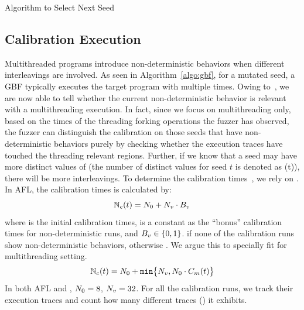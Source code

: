 \begin{algorithm}[t]
  \caption{Algorithm to Select Next Seed}\label{algo:select_seed}
\end{algorithm}


\subsection{Calibration Execution}\label{sec:calibrate}
Multithreaded programs introduce non-deterministic behaviors when different interleavings are involved.
As seen in Algorithm~\ref{algo:gbf}, for a mutated seed, a GBF typically executes the target program with multiple times. 
Owing to~\rtifunc, we are now able to tell whether the current non-deterministic behavior is relevant with a multithreading execution. In fact, since we focus on multithreading only, based on the times of the threading forking operations the fuzzer has observed, the fuzzer can distinguish the calibration on those seeds that have non-deterministic behaviors purely by checking whether the execution traces have touched the threading relevant regions. Further, if we know that a seed may have more distinct values of \tctxSign (the number of distinct values for seed $t$ is denoted as \Nmt(t)), there will be more interleavings. To determine the calibration times~\Ncal, we rely on \Nmt. In AFL, the calibration times is calculated by:
{\myeqsize\begin{equation}
    \mathbb{N}_{c}(t) = N_0 + N_v\cdot B_v \label{eq:afl_cal}
\end{equation}}
where \NcalO is the initial calibration times, \NcalV is a constant as the ``bonus'' calibration times for non-deterministic runs, and $B_v\in\{0,1\}$.  if none of the \NcalO calibration runs show non-deterministic behaviors, otherwise . We argue this to specially fit for multithreading setting. 
{\myeqsize\begin{equation}
    \mathbb{N}_{c}(t) = N_0 + \texttt{min}\big\{N_v, N_0\cdot C_{m}(t)\big\}
\end{equation}}
In both AFL and \mtfuzz, $N_0=8$, $N_v=32$.
For all the \Ncal calibration runs, we track their execution traces and count how many different traces (\NcalTrace) it exhibits. 


